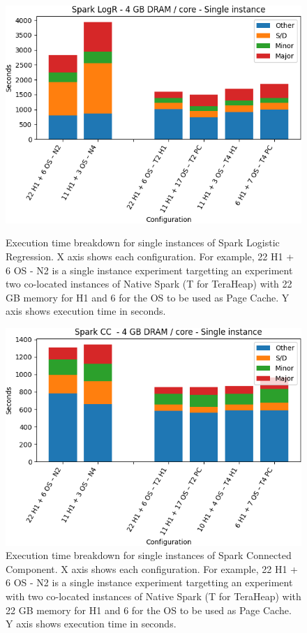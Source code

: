 \begin{figure}[thbp]
        \centering
    \includegraphics[width=\linewidth]{./fig/logr64_single.png}
    \caption{Execution time breakdown for single instances of Spark
    Logistic Regression. X axis shows each configuration.
        For example, 22 H1 + 6 OS - N2 is a single instance experiment targetting an experiment two co-located instances of Native Spark (T for TeraHeap) with 22 GB memory for H1 and 6 for the OS to be used as Page Cache. Y axis shows execution time in seconds.}
    \label{fig:logr64_single}

    \includegraphics[width=\linewidth]{./fig/cc64_single.png}
    \caption{Execution time breakdown for single instances of Spark
    Connected Component. X axis shows each configuration.
        For example, 22 H1 + 6 OS - N2 is a single instance experiment targetting an experiment with two co-located instances of Native Spark (T for TeraHeap) with 22 GB memory for H1 and 6 for the OS to be used as Page Cache. Y axis shows execution time in seconds.}
    \label{fig:cc64_single}
\end{figure}

